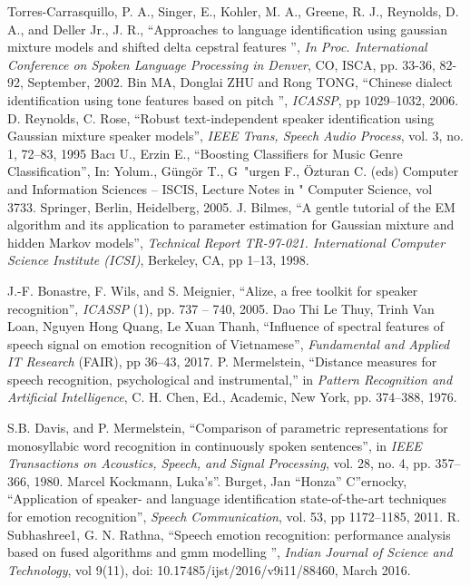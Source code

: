\documentclass[a4paper,12pt]{article}
\begin{document}
\begin{thebibliography}{20}
Torres-Carrasquillo, P. A., Singer, E., Kohler, M. A., Greene, R. J., Reynolds, D. A., and Deller
Jr., J. R., “Approaches to language identification using gaussian mixture models and shifted
delta cepstral features ”, \textit{In Proc. International Conference on Spoken Language Processing
in Denver}, CO, ISCA, pp. 33-36, 82-92, September, 2002.
 Bin MA, Donglai ZHU and Rong TONG, “Chinese dialect identification using tone features
based on pitch ”, \textit{ICASSP}, pp 1029–1032, 2006.
D. Reynolds, C. Rose, “Robust text-independent speaker identification using Gaussian mixture
speaker models”, \textit{IEEE Trans, Speech Audio Process}, vol. 3, no. 1, 72–83, 1995
Bacı U., Erzin E., “Boosting Classifiers for Music Genre Classification”, In: Yolum., G\"{u}ng\"{o}r
T., G\
"{u}rgen F., \"{O}zturan C. (eds) Computer and Information Sciences – ISCIS, Lecture Notes in "
Computer Science, vol 3733. Springer, Berlin, Heidelberg, 2005.
J. Bilmes, “A gentle tutorial of the EM algorithm and its application to parameter estimation for
Gaussian mixture and hidden Markov models”,\textit{ Technical Report TR-97-021. International
Computer Science Institute (ICSI)}, Berkeley, CA, pp 1–13, 1998.

 J.-F. Bonastre, F. Wils, and S. Meignier, “Alize, a free toolkit for speaker recognition”, \textit{ICASSP}
(1), pp. 737 – 740, 2005.
Dao Thi Le Thuy, Trinh Van Loan, Nguyen Hong Quang, Le Xuan Thanh, “Influence of spectral
features of speech signal on emotion recognition of Vietnamese”, \textit{Fundamental and Applied IT
Research} (FAIR), pp 36–43, 2017.
P. Mermelstein, “Distance measures for speech recognition, psychological and instrumental,” in
\textit{Pattern Recognition and Artificial Intelligence}, C. H. Chen, Ed., Academic, New York, pp.
374–388, 1976.

 S.B. Davis, and P. Mermelstein, “Comparison of parametric representations for monosyllabic
word recognition in continuously spoken sentences”, in \textit { IEEE Transactions on Acoustics,
Speech, and Signal Processing}, vol. 28, no. 4, pp. 357–366, 1980.
\bibitem{19}Marcel Kockmann, Luka’s”. Burget, Jan “Honza” C”ernocky, “Application of speaker- and
language identification state-of-the-art techniques for emotion recognition”,\textit{ Speech Communication}, vol. 53, pp 1172–1185, 2011.
\bibitem{20}R. Subhashree1, G. N. Rathna, “Speech emotion recognition: performance analysis based on
fused algorithms and gmm modelling ”, \textit{ Indian Journal of Science and Technology}, vol 9(11),
doi: 10.17485/ijst/2016/v9i11/88460, March 2016.


\end{thebibliography}
\end{document}
